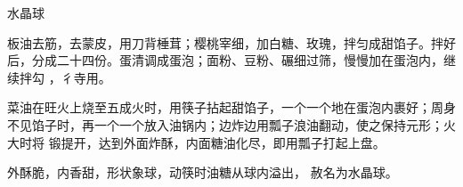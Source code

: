 \begin{recipe}{水晶球}

\ingredients


\cooking

\step 板油去筋，去蒙皮，用刀背棰茸；樱桃宰细，加白糖、玫瑰，拌匀成甜馅子。拌好
后，分成二十四份。蛋清调成蛋泡；面粉、豆粉、碾细过筛，慢慢加在蛋泡内，继续拌勾
，彳寺用。

\step 菜油在旺火上烧至五成火时，用筷子拈起甜馅子，一个一个地在蛋泡内裹好；周身
不见馅子时，再一个一个放入油锅内；边炸边用瓢子浪油翻动，使之保持元形；火大时将
锻提开，达到外面炸酥，内面糖油化尽，即用瓢子打起上盘。

\notes

外酥脆，内香甜，形状象球，动筷时油糖从球内溢出， 赦名为水晶球。

\end{recipe}

